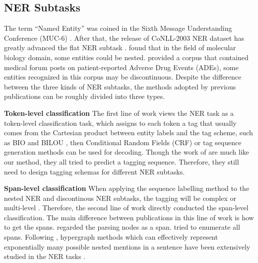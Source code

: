 \documentclass[11pt,a4paper]{article}
\begin{document}
\subsection{NER Subtasks}
The term ``Named Entity'' was coined in the Sixth Message Understanding Conference (MUC-6) \citep{DBLP:conf/coling/GrishmanS96}. After that, the release of CoNLL-2003 NER dataset has greatly advanced the flat NER subtask \citep{DBLP:conf/conll/SangM03}. \citet{DBLP:conf/ismb/KimOTT03} found that in the field of molecular biology domain, some entities could be nested. \citet{DBLP:journals/jbi/KarimiMKW15} provided a corpus that contained medical forum posts on patient-reported Adverse Drug Events (ADEs), some entities recognized in this corpus may be discontinuous. Despite the difference between the three kinds of NER subtasks, the methods adopted by previous publications can be roughly divided into three types.

\textbf{Token-level classification} The first line of work views the NER task as a token-level classification task, which assigns to each token a tag that usually comes from the Cartesian product between entity labels and the tag scheme, such as BIO and BILOU \citep{DBLP:conf/conll/RatinovR09,DBLP:journals/jmlr/CollobertWBKKK11,DBLP:journals/corr/HuangXY15,DBLP:journals/tacl/ChiuN16,DBLP:conf/naacl/LampleBSKD16,DBLP:conf/bionlp/AlexHG07,DBLP:conf/acl/StrakovaSH19,DBLP:conf/semweb/Metke-JimenezK16,DBLP:conf/emnlp/MuisL17,DBLP:conf/acl/DaiKHP20}, then Conditional Random Fields (CRF) \citep{lafferty2001conditional} or tag sequence generation methods can be used for decoding. Though the work of \citep{DBLP:conf/acl/StrakovaSH19,DBLP:conf/pakdd/WangLZXL19,DBLP:conf/ijcai/ZhangCZLY18,DBLP:conf/coling/ChenM18} are much like our method, they all tried to predict a tagging sequence. Therefore, they still need to design tagging schemas for different NER subtasks.

\textbf{Span-level classification} When applying the sequence labelling method to the nested NER and discontinous NER subtasks, the tagging will be complex \citep{DBLP:conf/acl/StrakovaSH19,DBLP:conf/semweb/Metke-JimenezK16} or multi-level \citep{DBLP:conf/naacl/JuMA18,DBLP:conf/acl/FisherV19,DBLP:journals/tacl/ShibuyaH20}. Therefore, the second line of work directly conducted the span-level classification. The main difference between publications in this line of work is how to get the spans. \citet{DBLP:conf/emnlp/FinkelM09} regarded the parsing nodes as a span. \citet{DBLP:conf/acl/XuJW17,DBLP:conf/naacl/LuanWHSOH19,DBLP:conf/emnlp/YamadaASTM20,DBLP:conf/acl/LiFMHWL20,DBLP:conf/acl/YuBP20,DBLP:conf/acl/WangSCC20} tried to enumerate all spans. Following \citet{DBLP:conf/emnlp/LuR15}, hypergraph methods which can effectively represent exponentially many possible nested mentions in a sentence have been extensively studied in the NER tasks \citep{DBLP:conf/naacl/KatiyarC18,DBLP:conf/emnlp/WangL18,DBLP:conf/emnlp/MuisL16}.
\end{document}
